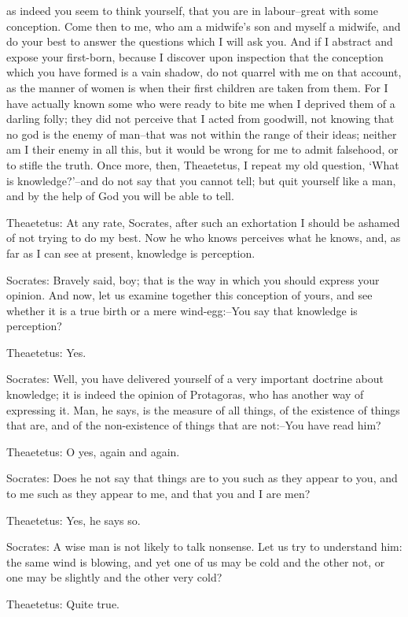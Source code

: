 as indeed you seem to think yourself, that you are in labour--great with
some conception. Come then to me, who am a midwife's son and myself a
midwife, and do your best to answer the questions which I will ask you.
And if I abstract and expose your first-born, because I discover upon
inspection that the conception which you have formed is a vain shadow,
do not quarrel with me on that account, as the manner of women is when
their first children are taken from them. For I have actually known some
who were ready to bite me when I deprived them of a darling folly; they
did not perceive that I acted from goodwill, not knowing that no god is
the enemy of man--that was not within the range of their ideas; neither
am I their enemy in all this, but it would be wrong for me to admit
falsehood, or to stifle the truth. Once more, then, Theaetetus, I repeat
my old question, `What is knowledge?'--and do not say that you cannot
tell; but quit yourself like a man, and by the help of God you will be
able to tell.

Theaetetus: At any rate, Socrates, after such an exhortation I should be
ashamed of not trying to do my best. Now he who knows perceives what he
knows, and, as far as I can see at present, knowledge is perception.

Socrates: Bravely said, boy; that is the way in which you should express
your opinion. And now, let us examine together this conception of yours,
and see whether it is a true birth or a mere wind-egg:--You say that
knowledge is perception?

Theaetetus: Yes.

Socrates: Well, you have delivered yourself of a very important doctrine
about knowledge; it is indeed the opinion of Protagoras, who has another
way of expressing it. Man, he says, is the measure of all things, of the
existence of things that are, and of the non-existence of things that
are not:--You have read him?

Theaetetus: O yes, again and again.

Socrates: Does he not say that things are to you such as they appear to
you, and to me such as they appear to me, and that you and I are men?

Theaetetus: Yes, he says so.

Socrates: A wise man is not likely to talk nonsense. Let us try to
understand him: the same wind is blowing, and yet one of us may be cold
and the other not, or one may be slightly and the other very cold?

Theaetetus: Quite true.

